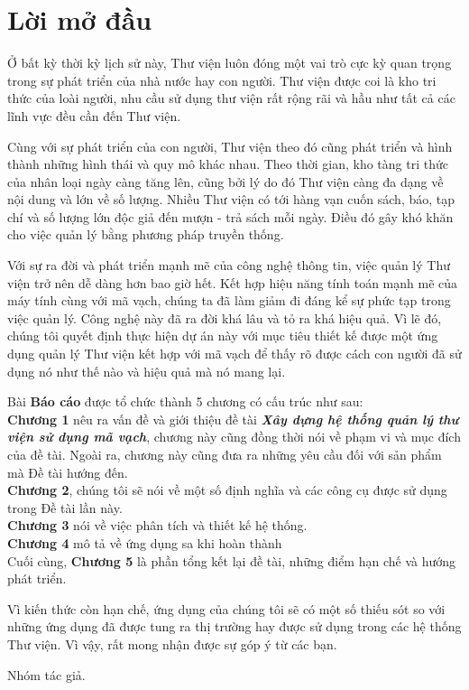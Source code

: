 \documentclass[12pt]{report}
\begin{document}
	\chapter*{Lời mở đầu}	
	\label{chpt:abstraction}	
		\par Ở bất kỳ thời kỳ lịch sử này, Thư viện luôn đóng một vai trò cực kỳ quan trọng trong sự phát triển của nhà nước hay con người. Thư viện được coi là kho tri thức của loài người, nhu cầu sử dụng thư viện rất rộng rãi và hầu như tất cả các lĩnh vực đều cần đến Thư viện.
		\par Cùng với sự phát triển của con người, Thư viện theo đó cũng phát triển và hình thành những hình thái và quy mô khác nhau. Theo thời gian, kho tàng tri thức của nhân loại ngày càng tăng lên, cũng bởi lý do đó Thư viện càng đa dạng về nội dung và lớn về số lượng. Nhiều Thư viện có tới hàng vạn cuốn sách, báo, tạp chí và số lượng lớn độc giả đến mượn - trả sách mỗi ngày. Điều đó gây khó khăn cho việc quản lý bằng phương pháp truyền thống.
		\par Với sự ra đời và phát triển mạnh mẽ của công nghệ thông tin, việc quản lý Thư viện trở nên dễ dàng hơn bao giờ hết. Kết hợp hiệu năng tính toán mạnh mẽ của máy tính cùng với mã vạch, chúng ta đã làm giảm đi đáng kể sự phức tạp trong việc quản lý. Công nghệ này đã ra đời khá lâu và tỏ ra khá hiệu quả. Vì lẽ đó, chúng tôi quyết định thực hiện dự án này với mục tiêu thiết kế được một ứng dụng quản lý Thư viện kết hợp với mã vạch để thấy rõ được cách con người đã sử dụng nó như thế nào và hiệu quả mà nó mang lại.
		\par Bài \textbf{Báo cáo} được tổ chức thành 5 chương có cấu trúc như sau:\\
		\textbf{Chương 1} nêu ra vấn đề và giới thiệu đề tài \textbf{\textit{Xây dựng hệ thống quản lý thư viện sử dụng mã vạch}}, chương này cũng đồng thời nói về phạm vi và mục đích của đề tài. Ngoài ra, chương này cũng đưa ra những yêu cầu đối với sản phẩm mà Đề tài hướng đến.\\
		\textbf{Chương 2}, chúng tôi sẽ nói về một số định nghĩa và các công cụ được sử dụng trong Đề tài lần này. \\
		\textbf{Chương 3} nói về việc phân tích và thiết kế hệ thống. \\
		\textbf{Chương 4} mô tả về ứng dụng sa khi hoàn thành\\
		Cuối cùng, \textbf{Chương 5} là phần tổng kết lại đề tài, những điểm hạn chế và hướng phát triển.
		\par Vì kiến thức còn hạn chế, ứng dụng của chúng tôi sẽ có một số thiếu sót so với những ứng dụng đã được tung ra thị trường hay được sử dụng trong các hệ thống Thư viện. Vì vậy, rất mong nhận được sự góp ý từ các bạn. 
		\begin{flushright}
			Nhóm tác giả.
		\end{flushright}
\end{document}
